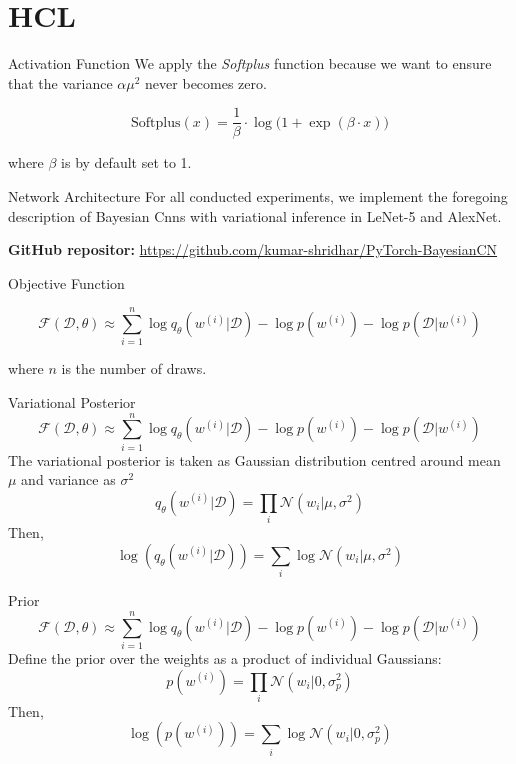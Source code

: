 \documentclass{beamer}
\begin{document}
\section{HCL}
\begin{frame}{Activation Function}
  We apply the \textit{Softplus} function because we want to ensure that the variance $\alpha \mu^2$ never becomes zero.

  \begin{equation}
    \text{Softplus}(x) = \frac{1}{\beta} \cdot \log \big( 1 + \exp(\beta \cdot x) \big)
  \end{equation}

  where $\beta$ is by default set to 1.
\end{frame}
\begin{frame}{Network Architecture}
  For all conducted experiments, we implement the foregoing description of Bayesian Cnns with
  variational inference in LeNet-5 and AlexNet. 

  \textbf{GitHub repositor:} \url{https://github.com/kumar-shridhar/PyTorch-BayesianCN}
\end{frame}
\begin{frame}{Objective Function}

  \begin{equation}
    \mathcal{F}(\mathcal{D}, \theta) \approx \sum_{i = 1}^n \log q_\theta(w^{(i)}|\mathcal{D}) - \log p(w^{(i)}) - \log p(\mathcal{D}|w^{(i)})
  \end{equation}

  where $n$ is the number of draws.
\end{frame}
\begin{frame}{Variational Posterior}
  \[
    \mathcal{F}(\mathcal{D}, \theta) \approx \sum_{i = 1}^n \log q_\theta(w^{(i)}|\mathcal{D}) - \log p(w^{(i)}) - \log p(\mathcal{D}|w^{(i)})
  \]
  The variational posterior is taken as Gaussian distribution centred around mean $\mu$ and variance as $\sigma^2$
  \begin{equation}
    q_\theta(w^{(i)}|\mathcal{D}) = \prod_i \mathcal{N}(w_i|\mu, \sigma^2)
  \end{equation}
  Then,
  \begin{equation}
    \log(q_\theta(w^{(i)}|\mathcal{D})) = \sum_i \log \mathcal{N}(w_i|\mu, \sigma^2)
  \end{equation}
\end{frame}
\begin{frame}{Prior}
  \[
    \mathcal{F}(\mathcal{D}, \theta) \approx \sum_{i = 1}^n \log q_\theta(w^{(i)}|\mathcal{D}) - \log p(w^{(i)}) - \log p(\mathcal{D}|w^{(i)})
  \]
  Define the prior over the weights as a product of individual Gaussians:
  \begin{equation}
    p(w^{(i)}) = \prod_i \mathcal{N}(w_i|0, \sigma_p^2)
  \end{equation}
  Then,
  \begin{equation}
    \log(p(w^{(i)})) = \sum_i \log \mathcal{N}(w_i|0, \sigma_p^2)
  \end{equation}
\end{frame}
\end{document}
